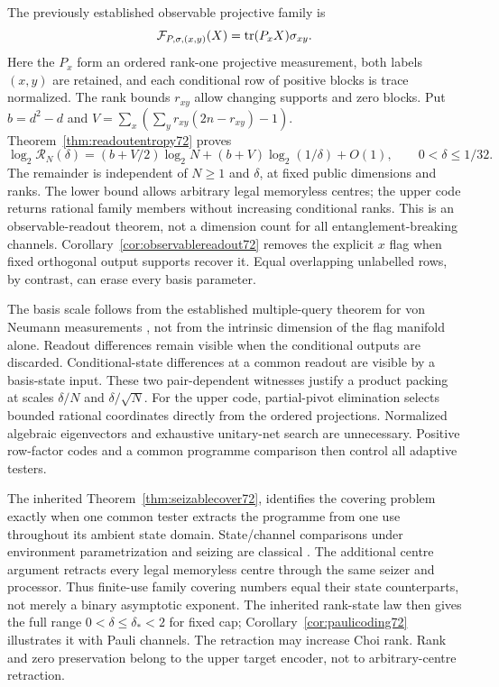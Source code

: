 The previously established observable projective family is
\[
 \mathcal F_{P,\sigma,(x,y)}(X)=\operatorname{tr}(P_xX)\sigma_{xy}.
\]
Here the $P_x$ form an ordered rank-one projective measurement, both
labels $(x,y)$ are retained, and each conditional row of positive
blocks is trace normalized. The rank bounds $r_{xy}$ allow changing
supports and zero blocks. Put $b=d^2-d$ and
$V=\sum_x(\sum_y r_{xy}(2n-r_{xy})-1)$.
Theorem~\ref{thm:readoutentropy72} proves
\[
 \log_2\mathcal R_N(\delta)
  =(b+V/2)\log_2N+(b+V)\log_2(1/\delta)+O(1),
 \qquad 0<\delta\le1/32.
\]
The remainder is independent of $N\ge1$ and $\delta$, at fixed
public dimensions and ranks. The lower bound allows arbitrary legal
memoryless centres; the upper code returns rational family members
without increasing conditional ranks. This is an observable-readout
theorem, not a dimension count for all entanglement-breaking channels.
Corollary~\ref{cor:observablereadout72} removes the explicit $x$ flag
when fixed orthogonal output supports recover it. Equal overlapping
unlabelled rows, by contrast, can erase every basis parameter.

The basis scale follows from the established multiple-query theorem
for von Neumann measurements \cite{PPKKO72}, not from the intrinsic
dimension of the flag manifold alone. Readout differences remain
visible when the conditional outputs are discarded. Conditional-state
differences at a common readout are visible by a basis-state input.
These two pair-dependent witnesses justify a product packing at scales
$\delta/N$ and $\delta/\sqrt N$. For the upper code, partial-pivot
elimination selects bounded rational coordinates directly from the
ordered projections. Normalized algebraic eigenvectors and exhaustive
unitary-net search are unnecessary. Positive row-factor codes and a
common programme comparison then control all adaptive testers.

The inherited Theorem~\ref{thm:seizablecover72}, identifies the
covering problem exactly when one common tester extracts the programme
from one use throughout its ambient state domain. State/channel
comparisons under environment parametrization and seizing are classical
\cite{DW72,WBHK72,WW72}. The additional centre argument retracts every
legal memoryless centre through the same seizer and processor. Thus
finite-use family covering numbers equal their state counterparts,
not merely a binary asymptotic exponent. The inherited rank-state law
then gives the full range $0<\delta\le\delta_*<2$ for fixed cap;
Corollary~\ref{cor:paulicoding72} illustrates it with Pauli channels.
The retraction may increase Choi rank. Rank and zero preservation
belong to the upper target encoder, not to arbitrary-centre retraction.

